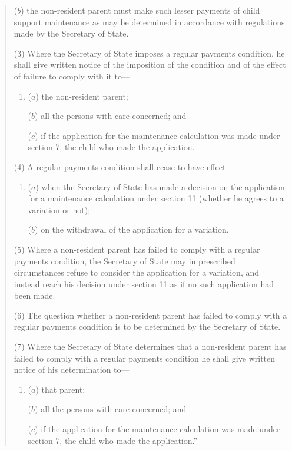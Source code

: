 \documentclass[12pt,a4paper]{article}
\begin{document}
\begin{quotation}
\begin{enumerate}
($b$) the non-resident parent must make such lesser payments of child support maintenance as may be determined in accordance with regulations made by the Secretary of State.
\end{enumerate}

(3) Where the Secretary of State imposes a regular payments condition, he shall give written notice of the imposition of the condition and of the effect of failure to comply with it to—
\begin{enumerate}\item[]
($a$) the non-resident parent;

($b$) all the persons with care concerned; and

($c$) if the application for the maintenance calculation was made under section 7, the child who made the application.
\end{enumerate}

(4) A regular payments condition shall cease to have effect—
\begin{enumerate}\item[]
($a$) when the Secretary of State has made a decision on the application for a maintenance calculation under section 11 (whether he agrees to a variation or not);

($b$) on the withdrawal of the application for a variation.
\end{enumerate}

(5) Where a non-resident parent has failed to comply with a regular payments condition, the Secretary of State may in prescribed circumstances refuse to consider the application for a variation, and instead reach his decision under section 11 as if no such application had been made.

(6) The question whether a non-resident parent has failed to comply with a regular payments condition is to be determined by the Secretary of State.

(7) Where the Secretary of State determines that a non-resident parent has failed to comply with a regular payments condition he shall give written notice of his determination to—
\begin{enumerate}\item[]
($a$) that parent;

($b$) all the persons with care concerned; and

($c$) if the application for the maintenance calculation was made under section 7, the child who made the application.”
\end{enumerate}
\end{quotation}
\end{document}
